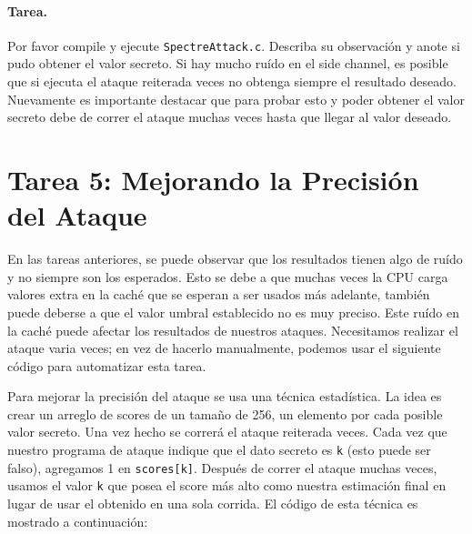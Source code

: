 \paragraph{Tarea.} Por favor compile y ejecute 
\texttt{SpectreAttack.c}. Describa su observación y anote si pudo obtener el valor secreto. Si hay mucho ruído en el side channel, es posible que si ejecuta el ataque reiterada veces no obtenga siempre el resultado deseado. Nuevamente es importante destacar que para probar esto y poder obtener el valor secreto debe de correr el ataque muchas veces hasta que llegar al valor deseado.



\section{Tarea 5: Mejorando la Precisión del Ataque}

En las tareas anteriores, se puede observar que los resultados tienen algo de ruído y no siempre son los esperados. Esto se debe a que muchas veces la CPU carga valores extra en la caché que se esperan a ser usados más adelante, también puede deberse a que el valor umbral establecido no es muy preciso.
Este ruído en la caché puede afectar los resultados de nuestros ataques. Necesitamos realizar el ataque varia veces; en vez de hacerlo manualmente, podemos usar el siguiente código para automatizar esta tarea.

Para mejorar la precisión del ataque se usa una técnica estadística.
La idea es crear un arreglo de scores de un tamaño de 256, un elemento por cada posible valor secreto. Una vez hecho se correrá el ataque reiterada veces. Cada vez que nuestro programa de ataque indique que el dato secreto es \texttt{k} (esto puede ser falso), agregamos 1 en \texttt{scores[k]}. Después de correr el ataque muchas veces, usamos el valor \texttt{k} que posea el score más alto como nuestra estimación final en lugar de usar el obtenido en una sola corrida. El código de esta técnica es mostrado a continuación:




